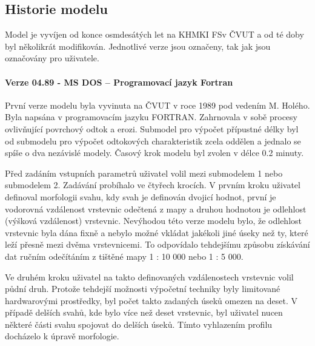 \subsection*{Historie modelu}
Model je vyvíjen od konce osmdesátých let na KHMKI FSv ČVUT a od té doby byl několikrát modifikován. Jednotlivé verze jsou označeny, tak jak jsou označovány pro uživatele.

\paragraph*{Verze 04.89 - MS DOS – Programovací jazyk Fortran}


První verze modelu byla vyvinuta na ČVUT v roce 1989 pod vedením M. Holého. Byla napsána v programovacím jazyku FORTRAN. Zahrnovala v sobě procesy ovlivňující povrchový odtok a erozi. Submodel pro výpočet přípustné délky byl od submodelu pro výpočet odtokových charakteristik zcela oddělen a jednalo se spíše o dva nezávislé modely. Časový krok modelu byl zvolen v délce 0.2 minuty.

Před zadáním vstupních parametrů uživatel volil mezi submodelem 1 nebo submodelem 2. Zadávání probíhalo ve čtyřech krocích. V prvním kroku uživatel definoval morfologii svahu, kdy svah je definován dvojicí hodnot, první je vodorovná vzdálenost vrstevnic odečtená z mapy a druhou hodnotou je odlehlost (výšková vzdálenost) vrstevnic. Nevýhodou této verze modelu bylo, že odlehlost vrstevnic byla dána fixně a nebylo možné vkládat jakékoli jiné úseky než ty, které leží přesně mezi dvěma vrstevnicemi. To odpovídalo tehdejšímu způsobu získávání dat ručním odečítáním z tištěné mapy 1 : 10 000 nebo 1 : 5 000.

Ve druhém kroku uživatel na takto definovaných vzdálenostech vrstevnic volil půdní druh. Protože tehdejší možnosti výpočetní techniky byly limitované hardwarovými prostředky, byl počet takto zadaných úseků omezen na deset. V případě delších svahů, kde bylo více než deset vrstevnic, byl uživatel nucen některé části svahu spojovat do delších úseků. Tímto vyhlazením profilu docházelo k úpravě morfologie.

